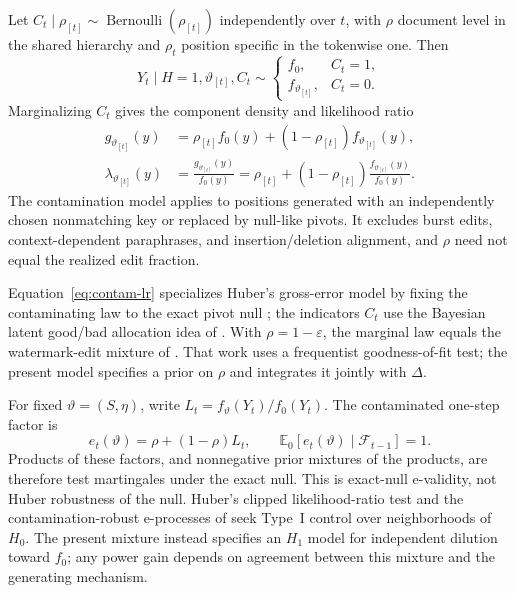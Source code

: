 \documentclass[11pt]{article}
\newcommand{\E}{\mathbb E}
\newcommand{\F}{\mathcal F}
\begin{document}
Let $C_t\mid\rho_{[t]}\sim\operatorname{Bernoulli}(\rho_{[t]})$ independently
over $t$, with $\rho$ document level in the shared hierarchy and $\rho_t$
position specific in the tokenwise one.  Then
\begin{equation}
  Y_t\mid H=1,\vartheta_{[t]},C_t
  \sim
  \begin{cases}
    f_0, & C_t=1,\\
        f_{\vartheta_{[t]}}, & C_t=0.
  \end{cases}
  \label{eq:contam-observation}
\end{equation}
Marginalizing $C_t$ gives the component density and likelihood ratio
\begin{align}
  g_{\vartheta_{[t]}}(y)
  &=\rho_{[t]}f_0(y)
    +(1-\rho_{[t]})f_{\vartheta_{[t]}}(y),\\
  \lambda_{\vartheta_{[t]}}(y)
  &=\frac{g_{\vartheta_{[t]}}(y)}{f_0(y)}
  =\rho_{[t]}+(1-\rho_{[t]})
    \frac{f_{\vartheta_{[t]}}(y)}{f_0(y)}.
  \label{eq:contam-lr}
\end{align}
The contamination model applies to positions generated with an independently chosen nonmatching key or replaced by null-like pivots.  It excludes burst edits, context-dependent paraphrases, and insertion/deletion alignment, and $\rho$ need not equal the realized edit fraction.

Equation~\eqref{eq:contam-lr} specializes Huber's gross-error model by fixing the contaminating law to the exact pivot null \citep{huber1964robust}; the indicators $C_t$ use the Bayesian latent good/bad allocation idea of \citet{box1968bayesian}.  With $\rho=1-\varepsilon$, the marginal law equals the watermark-edit mixture of \citet{li2024robust}.  That work uses a frequentist goodness-of-fit test; the present model specifies a prior on $\rho$ and integrates it jointly with $\Delta$.

For fixed $\vartheta=(S,\eta)$, write $L_t=f_{\vartheta}(Y_t)/f_0(Y_t)$.  The contaminated one-step factor is
\begin{equation}
  e_t(\vartheta)=\rho+(1-\rho)L_t,
  \qquad
  \E_0\!\left[e_t(\vartheta)\mid\F_{t-1}\right]=1.
  \label{eq:contamination-evalue}
\end{equation}
Products of these factors, and nonnegative prior mixtures of the products, are therefore test martingales under the exact null.  This is exact-null e-validity, not Huber robustness of the null.  Huber's clipped likelihood-ratio test \citep{huber1965robust} and the contamination-robust e-processes of \citet{saha2026huber} seek Type~I control over neighborhoods of $H_0$.  The present mixture instead specifies an $H_1$ model for independent dilution toward $f_0$; any power gain depends on agreement between this mixture and the generating mechanism.
\end{document}
